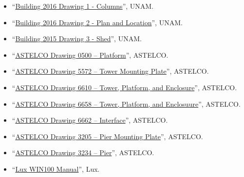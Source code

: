 \begin{flushleft}
\begin{itemize}
\ifddoti
\item “\href{bibliography/unam-ddoti-building-drawing-2016-1.pdf}{Building 2016 Drawing 1 - Columns}”, UNAM.
\item “\href{bibliography/unam-ddoti-building-drawing-2016-2.pdf}{Building 2016 Drawing 2 - Plan and Location}”, UNAM.
\item “\href{bibliography/unam-ddoti-building-drawing-2016-3.pdf}{Building 2015 Drawing 3 - Shed}”, UNAM.
\item “\href{bibliography/astelco-enclosure-drawing-0500}{ASTELCO Drawing 0500 -- Platform}”, ASTELCO.
\item “\href{bibliography/astelco-enclosure-drawing-5772}{ASTELCO Drawing 5572 -- Tower Mounting Plate}”, ASTELCO.
\item “\href{bibliography/astelco-enclosure-drawing-5772}{ASTELCO Drawing 6610 --  Tower, Platform, and Enclosure}”, ASTELCO.
\item “\href{bibliography/astelco-enclosure-drawing-5772}{ASTELCO Drawing 6658 -- Tower, Platform, and Enclosuure}”, ASTELCO.
\item “\href{bibliography/astelco-enclosure-drawing-5772}{ASTELCO Drawing 6662 -- Interface}”, ASTELCO.
\item “\href{bibliography/astelco-ddoti-pier-drawing-3205}{ASTELCO Drawing 3205 -- Pier Mounting Plate}”, ASTELCO.
\item “\href{bibliography/astelco-ddoti-pier-drawing-3205}{ASTELCO Drawing 3234 -- Pier}”, ASTELCO.
\fi

\item “\href{bibliography/lux-win100-manual}{Lux WIN100 Manual}”, Lux.

\end{itemize}
\end{flushleft}
